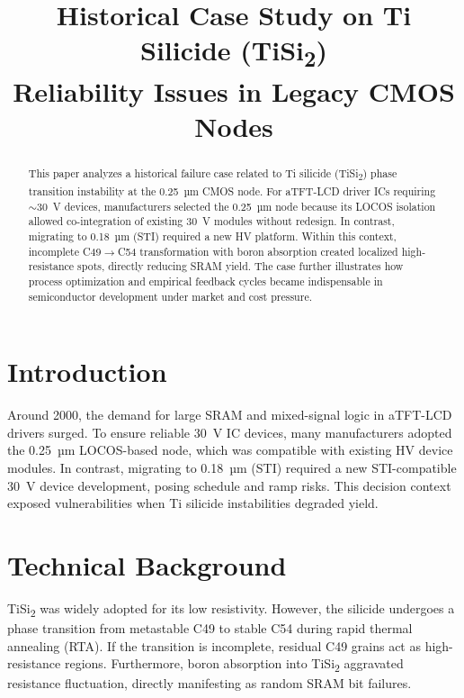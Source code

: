 \documentclass[conference]{IEEEtran}
\begin{document}
\title{Historical Case Study on Ti Silicide (TiSi\textsubscript{2}) \\ Reliability Issues in Legacy CMOS Nodes}

\author{
}

\maketitle

\begin{abstract}
This paper analyzes a historical failure case related to Ti silicide (TiSi\textsubscript{2}) phase transition instability at the 0.25~µm CMOS node. 
For aTFT-LCD driver ICs requiring $\sim$30~V devices, manufacturers selected the 0.25~µm node because its LOCOS isolation allowed co-integration of existing 30~V modules without redesign. 
In contrast, migrating to 0.18~µm (STI) required a new HV platform. 
Within this context, incomplete C49$\rightarrow$C54 transformation with boron absorption created localized high-resistance spots, directly reducing SRAM yield. 
The case further illustrates how process optimization and empirical feedback cycles became indispensable in semiconductor development under market and cost pressure.
\end{abstract}

\section{Introduction}
Around 2000, the demand for large SRAM and mixed-signal logic in aTFT-LCD drivers surged. 
To ensure reliable 30~V IC devices, many manufacturers adopted the 0.25~µm LOCOS-based node, which was compatible with existing HV device modules. 
In contrast, migrating to 0.18~µm (STI) required a new STI-compatible 30~V device development, posing schedule and ramp risks. 
This decision context exposed vulnerabilities when Ti silicide instabilities degraded yield.

\section{Technical Background}
TiSi\textsubscript{2} was widely adopted for its low resistivity. 
However, the silicide undergoes a phase transition from metastable C49 to stable C54 during rapid thermal annealing (RTA). 
If the transition is incomplete, residual C49 grains act as high-resistance regions. 
Furthermore, boron absorption into TiSi\textsubscript{2} aggravated resistance fluctuation, directly manifesting as random SRAM bit failures.
\end{document}
